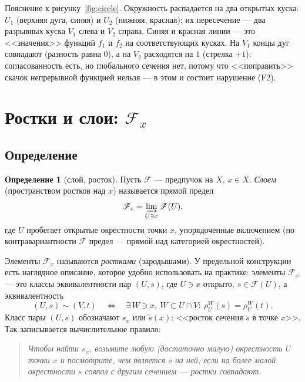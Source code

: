 \documentclass[11pt,b5paper]{article}
\newcommand{\Shv}[1]{\mathscr{#1}}   %
\newcommand{\res}{\rho}              %
\newcommand{\dirlim}{\varinjlim}
\theoremstyle{plain}
\theoremstyle{definition}
\newtheorem{defninner}[thminner]{Определение}
\theoremstyle{remark}
\newcommand{\thmbeg}{%
  \par\smallskip
  \begin{lrbox}{\thmbox}%
  \begin{minipage}{\linewidth}}
\newcommand{\thmend}{%
  \end{minipage}%
  \end{lrbox}%
  \noindent\usebox{\thmbox}%
  \par\smallskip}
\newenvironment{defn}{\thmbeg\begin{defninner}}{\end{defninner}\thmend}
\let\brutsection\section
\renewcommand{\section}{\Needspace{7\baselineskip}\brutsection}
\let\brutsubsection\subsection
\renewcommand{\subsection}{\Needspace{5\baselineskip}\brutsubsection}
\begin{document}
Пояснение к рисунку~\ref{fig:circle}. Окружность распадается на
два открытых куска: $U_1$ (верхняя дуга, синяя) и $U_2$ (нижняя,
красная); их пересечение --- два разрывных куска $V_1$ слева и
$V_2$ справа. Синяя и красная линии --- это <<значения>> функций
$f_1$ и $f_2$ на соответствующих кусках. На $V_1$ концы дуг
совпадают (разность равна $0$), а на $V_2$ расходятся на $1$
(стрелка $+1$): согласованность есть, но глобального сечения
нет, потому что <<поправить>> скачок непрерывной функцией
нельзя --- в этом и состоит нарушение (F2).

\section[Ростки и слои: $\Shv{F}_x$]{Ростки и слои: $\Shv{F}_x$}

\subsection{Определение}
\leavevmode\par
\begin{defn}[слой, росток]
Пусть $\Shv{F}$ --- предпучок на $X$, $x\in X$. \emph{Слоем}
(пространством ростков над $x$) называется прямой предел
\begin{equation}\label{eq:stalk}
 \Shv{F}_x=\dirlim_{U\ni x}\Shv{F}(U),
\end{equation}
где $U$ пробегает открытые окрестности точки $x$, упорядоченные
включением (по контравариантности $\Shv{F}$ предел --- прямой над
категорией окрестностей).
\end{defn}

Элементы $\Shv{F}_x$ называются \emph{ростками} (зародышами). У
предельной конструкции есть наглядное описание, которое удобно
использовать на практике: элементы $\Shv{F}_x$ --- это классы
эквивалентности пар $(U,s)$, где $U\ni x$ открыто, $s\in\Shv{F}(U)$, а
эквивалентность
\[
 (U,s)\sim(V,t)
 \quad\Longleftrightarrow\quad
 \exists\, W\ni x,\ W\subset U\cap V:\ \res^{W}_{U}(s)=\res^{W}_{V}(t).
\]
Класс пары $(U,s)$ обозначают $s_x$ или $\tilde s(x)$: <<росток
сечения $s$ в точке $x$>>. Так записывается вычислительное правило:

\begin{quote}
\itshape Чтобы найти $s_x$, возьмите любую (достаточно малую)
окрестность $U$ точки $x$ и посмотрите, чем является $s$ на ней;
если на более малой окрестности $s$ совпал с другим сечением ---
ростки совпадают.
\end{quote}
\end{document}
